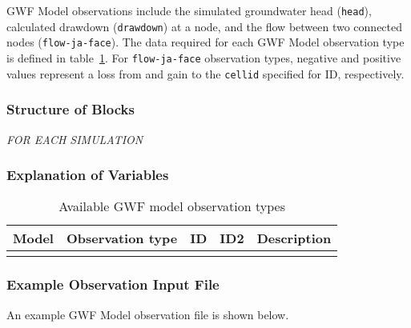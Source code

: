 
GWF Model observations include the simulated groundwater head (\texttt{head}), calculated drawdown (\texttt{drawdown}) at a node, and the flow between two connected nodes (\texttt{flow-ja-face}). The data required for each GWF Model observation type is defined in table~\ref{table:gwfobstype}. For \texttt{flow-ja-face} observation types, negative and positive values represent a loss from and gain to the \texttt{cellid} specified for ID, respectively.

\subsubsection{Structure of Blocks}
\vspace{5mm}

\noindent \textit{FOR EACH SIMULATION}



\subsubsection{Explanation of Variables}
\begin{description}

\end{description}


\begin{longtable}{p{2cm} p{2.75cm} p{2cm} p{1.25cm} p{7cm}}
\caption{Available GWF model observation types} \tabularnewline

\hline
\hline
\textbf{Model} & \textbf{Observation type} & \textbf{ID} & \textbf{ID2} & \textbf{Description} \\
\hline
\endhead

\hline
\endfoot


\label{table:gwfobstype}
\end{longtable}

\vspace{5mm}
\subsubsection{Example Observation Input File}

An example GWF Model observation file is shown below.



